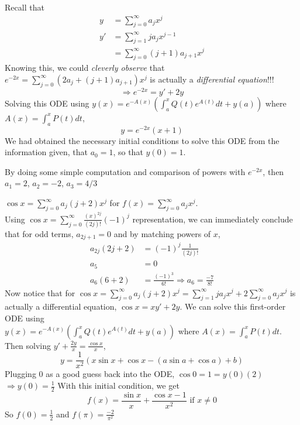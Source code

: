 \documentclass[twoside]{amsart}
\theoremstyle{plain}
\theoremstyle{definition}
\newcommand{\exercisehead}[1]
  {\smallskip
   \noindent{\small\bf Exercise #1.}}
\begin{document}
\exercisehead{18} Recall that \[
\begin{aligned}
  y & = \sum_{j=0}^{\infty} a_j x^j \\
  y' & = \sum_{j=1}^{\infty} j a_j x^{j-1} \\
  & = \sum_{j=0}^{\infty} (j+1)a_{j+1} x^j
\end{aligned}
\]
Knowing this, we could \emph{cleverly observe} that $e^{-2x} = \sum_{j=0}^{\infty} (2a_j + (j+1)a_{j+1})x^j$ is actually a \emph{differential equation}!!!
\[
\Longrightarrow e^{-2x} = y' + 2y
\]
Solving this ODE using $y(x) = e^{-A(x)} \left( \int_a^x Q(t) e^{A(t)} dt + y(a) \right)$ where $A(x) = \int_a^x P(t)dt$, 
\[
\boxed{ y = e^{-2x}(x+1) }
\]
We had obtained the necessary initial conditions to solve this ODE from the information given, that $a_0 = 1$, so that $y(0)=1$.  

By doing some simple computation and comparison of powers with $e^{-2x}$, then $a_1  =2$, $a_2 = -2$, $a_3 = 4/3$

\exercisehead{19} $\cos{x} = \sum_{j=0}^{\infty} a_j (j+2) x^j$ for $f(x) = \sum_{j=0}^{\infty} a_j x^j$.  \bigskip \\

Using $\cos{x} = \sum_{j=0}^{\infty} \frac{(x)^{2j}}{ (2j)!} (-1)^j $ representation, we can immediately conclude that for odd terms, $a_{2j+1} = 0$ and by matching powers of $x$,
\[
\begin{aligned}
  a_{2j}(2j+2) & = (-1)^j \frac{1}{(2j)!} \\
  a_5 & = 0 \\
  a_6 (6+2) & = \frac{(-1)^3 }{6!} \Longrightarrow \boxed{ a_6 = \frac{-7}{8!}}
\end{aligned}
\]
Now notice that for $\cos{x} = \sum_{j=0}^{\infty} a_j (j+2) x^j = \sum_{j=1}^{\infty}ja_j x^j + 2 \sum_{j=0}^{\infty} a_j x^j$ is actually a differential equation, $\cos{x} = xy' + 2y$.  We can solve this first-order ODE using \medskip \\
$y(x) = e^{-A(x)} \left( \int_a^x Q(t) e^{A(t)} dt + y(a) \right)$ where $A(x) = \int_a^x P(t)dt$.  Then solving $y' + \frac{2y}{x} =\frac{\cos{x}}{x} $, 
\[
y = \frac{1}{x^2} ( x \sin{x} + \cos{x} - (a\sin{a} + \cos{a}) + b) 
\]
Plugging $0$ as a good guess back into the ODE, $\cos{0} = 1 = y(0) (2)$ \quad $\Longrightarrow y(0) = \frac{1}{2}$  With this initial condition, we get
\[
\boxed{f(x) = \frac{ \sin{x}}{x} + \frac{ \cos{x} - 1 }{x^2} } \text{ if } x \neq 0 
\]
So $f(0)=\frac{1}{2}$ and $f(\pi) = \frac{-2}{\pi^2 }$ 
\end{document}
